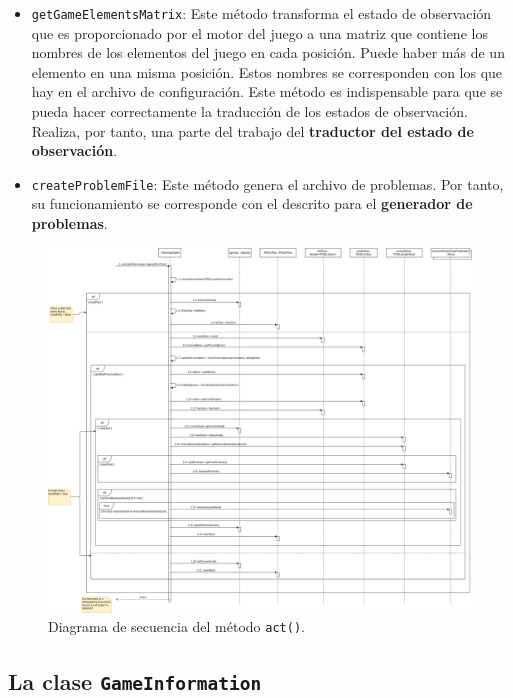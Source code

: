 \begin{itemize}[label=\textbullet]
    \item \texttt{getGameElementsMatrix}: Este método transforma el estado de observación que es
    proporcionado por el motor del juego a una matriz que contiene los nombres de los elementos del
    juego en cada posición. Puede haber más de un elemento en una misma posición. Estos nombres se
    corresponden con los que hay en el archivo de configuración. Este método es indispensable para
    que se pueda hacer correctamente la traducción de los estados de observación. Realiza, por tanto,
    una parte del trabajo del \textbf{traductor del estado de observación}.
    
    \item \texttt{createProblemFile}: Este método genera el archivo de problemas. Por tanto, su
    funcionamiento se corresponde con el descrito para el \textbf{generador de problemas}.
\end{itemize}

\begin{figure}[H]
    \centering
    \includegraphics[scale=0.22]{img/CH07/sequence_diagram.png}
    \caption{Diagrama de secuencia del método \texttt{act()}.}
    \label{fig:sequence_diagram}
\end{figure}

\subsection{La clase \texttt{GameInformation}}


